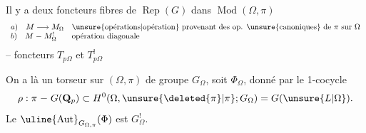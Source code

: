 
Il y a deux foncteurs fibres de $\operatorname{Rep}(G)$ dans $\operatorname{Mod}(\Omega,\pi)$
\[
\begin{array}{ll}
a)\quad M\longrightarrow M_\Omega &
\text{\unsure{opérations|opération} provenant des op. \unsure{canoniques} de }\pi\text{ sur }\Omega\\
b)\quad M\mathrel{-}M_\Omega^! &\text{opération diagonale}
\end{array}
\]
-- foncteurs $T_{p\Omega}$ et $T^!_{p\Omega}$

 On a là un \deleted{$(\Omega,\pi)$} torseur  sur
$(\Omega,\pi)$ de groupe $G_\Omega$, soit $\Phi_\Omega$, donné par le 1-cocycle
\[
\rho:\pi\mathrel{-}G(\mathbf Q_p)\subset H^0(\Omega,\unsure{\deleted{\pi}|\pi};G_\Omega)=G(\unsure{L|\Omega}).
\]
Le  $\uline{\operatorname{Aut}}_{G_{\Omega,\pi}}(\Phi)$ est $G_\Omega^!$.
\margin{$(\Omega,\pi)$}
